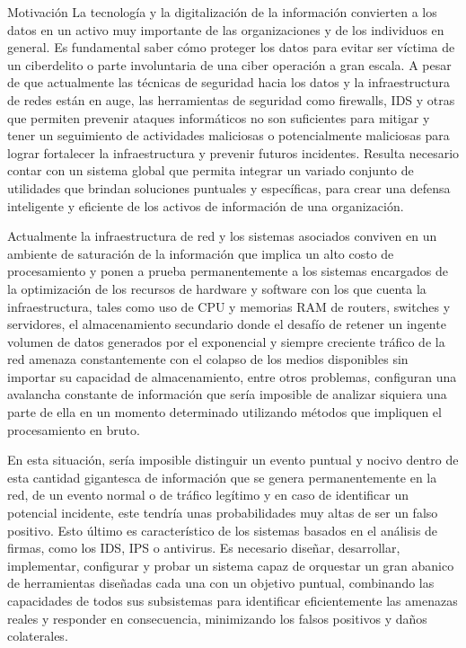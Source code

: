     \begin{section}{Motivación}
        La tecnología y la digitalización de la información convierten a los datos en un activo muy importante de las organizaciones y de los individuos en general. Es fundamental saber cómo proteger los datos para evitar ser víctima de un ciberdelito o parte involuntaria de una ciber operación a gran escala. A pesar de que actualmente las técnicas de seguridad hacia los datos y la infraestructura de redes están en auge, las herramientas de seguridad como firewalls, IDS y otras que permiten prevenir ataques informáticos no son suficientes para mitigar y tener un seguimiento de actividades maliciosas o potencialmente maliciosas para lograr fortalecer la infraestructura y prevenir futuros incidentes. Resulta necesario contar con un sistema global que permita integrar un variado conjunto de utilidades que brindan soluciones puntuales y específicas, para crear una defensa inteligente y eficiente de los activos de información de una organización. \par
        Actualmente la infraestructura de red y los sistemas asociados conviven en un ambiente de saturación de la información que implica un alto costo de procesamiento y ponen a prueba permanentemente a los sistemas encargados de la optimización de los recursos de hardware y software con los que cuenta la infraestructura, tales como uso de CPU y memorias RAM de routers, switches y servidores, el almacenamiento secundario donde el desafío de retener un ingente volumen de datos generados por el exponencial y siempre creciente tráfico de la red amenaza constantemente con el colapso de los medios disponibles sin importar su capacidad de almacenamiento, entre otros problemas, configuran una avalancha constante de información que sería imposible de analizar siquiera una parte de ella en un momento determinado utilizando métodos que impliquen el procesamiento en bruto.  \par
        En esta situación, sería imposible distinguir un evento puntual y nocivo dentro de esta cantidad gigantesca de información que se genera permanentemente en la red, de un evento normal o de tráfico legítimo y en caso de identificar un potencial incidente, este tendría unas probabilidades muy altas de ser un falso positivo. Esto último es característico de los sistemas basados en el análisis de firmas, como los IDS, IPS o antivirus. Es necesario diseñar, desarrollar, implementar, configurar y probar un sistema capaz de orquestar un gran abanico de herramientas diseñadas cada una con un objetivo puntual, combinando las capacidades de todos sus subsistemas para identificar eficientemente las amenazas reales y responder en consecuencia, minimizando los falsos positivos y daños colaterales.

    \end{section}